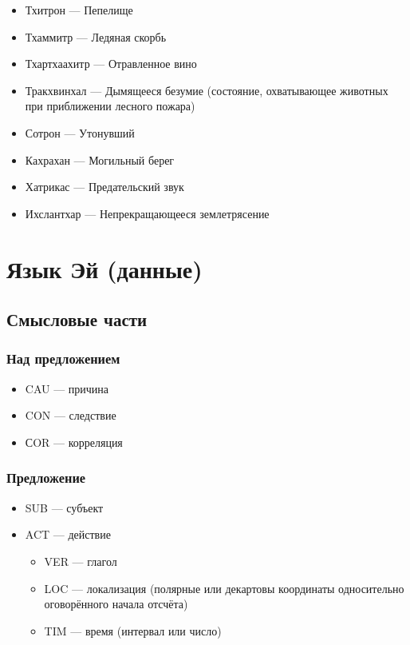\documentclass[a4paper,12pt,fleqn]{book}\usepackage{cooltooltips}\usepackage{polyglossia}\setdefaultlanguage[babelshorthands=true]{russian}\setotherlanguage{english}\defaultfontfeatures{Ligatures=TeX,Mapping=tex-text} \usepackage{xcolor}\definecolor{lightgray}{HTML}{bbbbbb}\color{lightgray}\newcommand{\ml}[3]{\textenglish{\textcolor{black}{#3}}}
\begin{document}
{\begin{itemize}
\item Тхитрон --- Пепелище
\item Тхаммитр --- Ледяная скорбь
\item Тхартхаахитр --- Отравленное вино
\item Тракхвинхал --- Дымящееся безумие (состояние, охватывающее животных при приближении лесного пожара)
\item Сотрон --- Утонувший
\item Кахрахан --- Могильный берег
\item Хатрикас --- Предательский звук
\item Ихслантхар --- Непрекращающееся землетрясение
\end{itemize}

\section{Язык Эй (данные)}

\subsection{Смысловые части}

\subsubsection{Над предложением}

\begin{itemize}
\item CAU --- причина
\item CON --- следствие
\item СOR --- корреляция
\end{itemize}

\subsubsection{Предложение}

\begin{itemize}
\item SUB --- субъект
\item ACT --- действие
\begin{itemize}
\item VER --- глагол
\item LOC --- локализация (полярные или декартовы координаты односительно оговорённого начала отсчёта)
\item TIM --- время (интервал или число)
\end{itemize}
\end{itemize}

}
\end{document}
